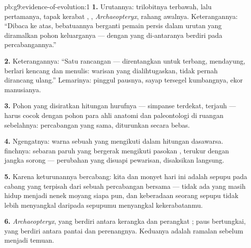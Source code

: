 \begin{solution}{pb:g9:evidence-of-evolution:1}
\textbf{1.} Urutannya: trilobitnya terbawah, lalu 
pertamanya, tapak kerabat , ,
\emph{Archaeopteryx}, rahang  awalnya. Keterangannya:
``Dibaca ke atas, bebatuannya berganti pemain persis dalam
urutan yang diramalkan pohon keluarganya --- dengan yang
di-antaranya berdiri pada percabangannya.''

\textbf{2.} Keterangannya: ``Satu rancangan  ---
direntangkan untuk terbang, mendayung, berlari kencang dan
menulis: warisan yang dialihtugaskan, tidak pernah dirancang
ulang.'' Lemarinya: pinggul pausnya, sayap tersegel
kumbangnya,  ekor manusianya.

\textbf{3.} Pohon yang disiratkan hitungan hurufnya ---
simpanse terdekat,  terjauh --- harus cocok dengan pohon
para ahli anatomi dan paleontologi di ruangan sebelahnya:
percabangan yang sama, diturunkan secara bebas.

\textbf{4.} Ngengatnya: warna sebuah  yang mengikuti
 dalam hitungan dasawarsa.  finchnya:
sebaran paruh yang bergerak mengikuti pasokan ,
terukur dengan jangka sorong --- perubahan yang disuapi
pewarisan, disaksikan langsung.

\textbf{5.} Karena keturunannya bercabang: kita dan monyet
hari ini adalah sepupu pada cabang yang terpisah dari sebuah
percabangan bersama --- tidak ada yang masih hidup menjadi
nenek moyang siapa pun, dan keberadaan seorang sepupu tidak
lebih menyangkal  daripada sepupumu menyangkal
kekerabatanmu.

\textbf{6.} \emph{Archaeopteryx}, yang berdiri antara
kerangka  dan perangkat ;  paus
bertungkai, yang berdiri antara  pantai dan
perenangnya. Keduanya adalah ramalan sebelum menjadi temuan.


\end{solution}
